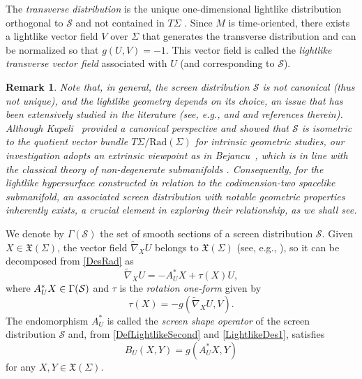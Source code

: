 \documentclass[11pt]{article}
\numberwithin{equation}{section}
\newtheorem{remark}[theorem]{Remark}
\begin{document}
	The \emph{transverse distribution} is the unique one-dimensional lightlike distribution orthogonal to $\mathcal{S}$ and not contained in $T\Sigma$ \cite[p.~44]{Duggal_Sahin}. Since $M$ is time-oriented, there exists a lightlike vector field $V$ over $\Sigma$ that generates the transverse distribution and can be normalized so that $g(U, V)=-1.$ This vector field is called the \emph{lightlike transverse vector field} associated with $U$ (and corresponding to $\mathcal{S}$).
	
	
	\begin{remark} \normalfont \label{remark:canonical_screen_Kupeli}
		Note that, in general, the screen distribution $\mathcal{S}$ is not canonical (thus not unique), and the lightlike geometry depends on its choice, an issue that has been extensively studied in the literature (see, e.g., \cite{DuggalGimenez} and \cite{Duggal_Sahin} and references therein). Although Kupeli~\cite{kupeli87} provided a canonical perspective and showed that $\mathcal{S}$ is isometric to the quotient vector bundle $T\Sigma/\mathrm{Rad}(\Sigma)$ for intrinsic geometric studies, our investigation adopts an extrinsic viewpoint as in Bejancu~\cite{Bejancu1996}, which is in line with the classical theory of non-degenerate submanifolds \cite{Dajczerbook}. Consequently, for the lightlike hypersurface constructed in relation to the codimension-two spacelike submanifold, an associated screen distribution with notable geometric properties inherently exists, a crucial element in exploring their relationship, as we shall see.
	\end{remark}
	
	We denote by $\Gamma({\mathcal S})$ the set of smooth sections of a screen distribution $\mathcal{S}$. Given $X\in {\mathfrak X}(\Sigma)$, the vector field $\widetilde{\nabla}_X U$ belongs to $\mathfrak{ X}(\Sigma)$ (see, e.g., \cite{Bejancu1996}), so it can be decomposed from \eqref{DesRad} as
	\begin{equation}\label{LightlikeDes1}
		\widetilde{\nabla}_X U= -A^*_UX+\tau(X)U,
	\end{equation}
	where $A^*_UX \in \Gamma({\cal S})$ and $\tau$ is the \emph{rotation one-form} given by
	\begin{equation}\label{rotation}
		\tau(X)=-g(\widetilde{\nabla}_X U,V).
	\end{equation}
	The endomorphism $A^*_U$ is called the \emph{screen shape operator} of the screen distribution $\mathcal S$ and, from \eqref{DefLightlikeSecond} and \eqref{LightlikeDes1}, satisfies 
	\begin{equation}\label{RelaLightlik}
		B_U(X,Y)=g(A^*_UX,Y)
	\end{equation}
	for any $X,Y \in {\mathfrak X}(\Sigma)$. 
	
\end{document}
